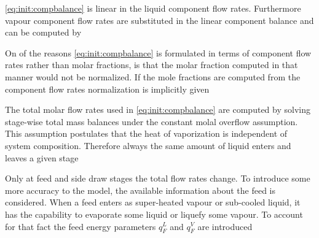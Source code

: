         \eqref{eq:init:compbalance} is linear in the liquid component flow rates. Furthermore vapour component
        flow rates are substituted in the linear component balance and can be computed by


        On of the reasons \eqref{eq:init:compbalance} is formulated in terms of component flow rates rather
        than molar fractions, is that the molar fraction computed in that manner would not be normalized. If
        the mole fractions are computed from the component flow rates normalization is implicitly given


        The total molar flow rates used in \eqref{eq:init:compbalance} are computed by solving
        stage-wise total mass balances under the constant molal overflow assumption. This assumption
        postulates that the heat of vaporization is independent of system composition.
        Therefore always the same amount of liquid enters and leaves a given stage

        Only at feed and side draw stages the total flow rates change. To introduce some more accuracy
        to the model, the available information about the feed is considered. When a feed enters as
        super-heated vapour or sub-cooled liquid, it has the capability to evaporate some liquid or
        liquefy some vapour. To account for that fact the feed energy parameters $q_F^L$ and $q_F^V$
        are introduced

